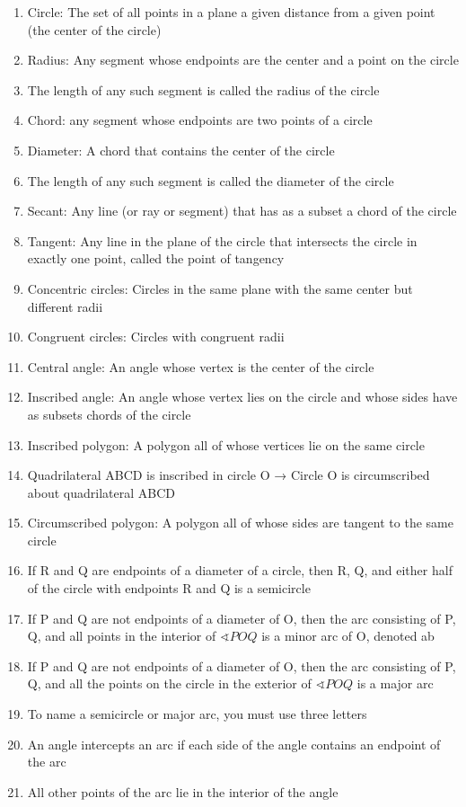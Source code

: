 \documentclass[11pt,letterpaper]{report}
\begin{document}
\begin{enumerate}
    \item Circle: The set of all points in a plane a given distance from a given point (the center of the circle)
    \item Radius: Any segment whose endpoints are the center and a point on the circle
    \item The length of any such segment is called the radius of the circle
    \item Chord: any segment whose endpoints are two points of a circle
    \item Diameter: A chord that contains the center of the circle
    \item The length of any such segment is called the diameter of the circle
    \item Secant: Any line (or ray or segment) that has as a subset a chord of the circle
    \item Tangent: Any line in the plane of the circle that intersects the circle in exactly one point, called the point of tangency
    \item Concentric circles: Circles in the same plane with the same center but different radii
    \item Congruent circles: Circles with congruent radii
    \item Central angle: An angle whose vertex is the center of the circle
    \item Inscribed angle: An angle whose vertex lies on the circle and whose sides have as subsets chords of the circle
    \item Inscribed polygon: A polygon all of whose vertices lie on the same circle
    \item Quadrilateral ABCD is inscribed in circle O → Circle O is circumscribed about quadrilateral ABCD
    \item Circumscribed polygon: A polygon all of whose sides are tangent to the same circle
    \item If R and Q are endpoints of a diameter of a circle, then R, Q, and either half of the circle with endpoints R and Q is a semicircle
    \item If P and Q are not endpoints of a diameter of O, then the arc consisting of P, Q, and all points in the interior of $\sphericalangle POQ$ is a minor arc of O, denoted ab
    \item If P and Q are not endpoints of a diameter of O, then the arc consisting of P, Q, and all the points on the circle in the exterior of $\sphericalangle POQ$ is a major arc
    \item To name a semicircle or major arc, you must use three letters
    \item An angle intercepts an arc if each side of the angle contains an endpoint of the arc
    \item All other points of the arc lie in the interior of the angle
\end{enumerate}
\end{document}
